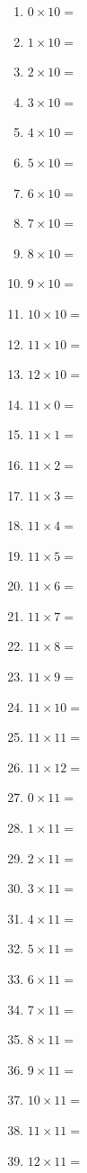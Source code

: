 \documentclass{article}
\begin{document}
\begin{multicols}{4}
\begin{enumerate}
\item $0 \times 10 =$
\item $1 \times 10 =$
\item $2 \times 10 =$
\item $3 \times 10 =$
\item $4 \times 10 =$
\item $5 \times 10 =$
\item $6 \times 10 =$
\item $7 \times 10 =$
\item $8 \times 10 =$
\item $9 \times 10 =$
\item $10 \times 10 =$
\item $11 \times 10 =$
\item $12 \times 10 =$

\item $11 \times 0 =$
\item $11 \times 1 =$
\item $11 \times 2 =$
\item $11 \times 3 =$
\item $11 \times 4 =$
\item $11 \times 5 =$
\item $11 \times 6 =$
\item $11 \times 7 =$
\item $11 \times 8 =$
\item $11 \times 9 =$
\item $11 \times 10 =$
\item $11 \times 11 =$
\item $11 \times 12 =$

\item $0 \times 11 =$
\item $1 \times 11 =$
\item $2 \times 11 =$
\item $3 \times 11 =$
\item $4 \times 11 =$
\item $5 \times 11 =$
\item $6 \times 11 =$
\item $7 \times 11 =$
\item $8 \times 11 =$
\item $9 \times 11 =$
\item $10 \times 11 =$
\item $11 \times 11 =$
\item $12 \times 11 =$


\end{enumerate}
\end{multicols}
\end{document}
